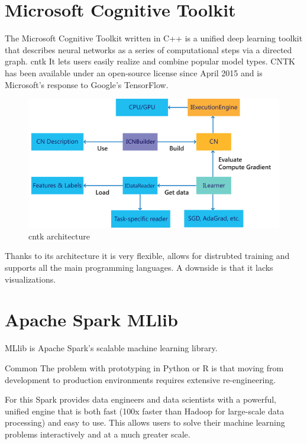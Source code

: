 \documentclass[thesis=M,english]{FITthesis}[2012/06/26]
\begin{document}
\section{Microsoft Cognitive Toolkit}

The Microsoft Cognitive Toolkit\cite{ml_cntk} written in C++ is a unified deep learning toolkit that describes neural networks as a series of computational steps via a directed graph. \acrshort{cntk} It lets users easily realize and combine popular model types. CNTK has been available under an open-source license since April 2015 and is Microsoft's response to Google's TensorFlow.


\begin{figure}[h!]\centering
	\includegraphics[width=1\textwidth]{pictures/ml_cntk_architecture}
	\caption{\acrshort{cntk} architecture \cite{ml_cntk}}\label{fig:ml_cntk_architecture}
\end{figure}

Thanks to its architecture it is very flexible, allows for distrubted training and supports all the main programming languages. A downside is that it lacks visualizations.

\section{Apache Spark MLlib}

MLlib\cite{ml_spark} is Apache Spark's scalable machine learning library.

Common\cite{ml_spark_advantages]} The problem with prototyping in Python or R is that moving from development to production environments requires extensive re-engineering. 

For this Spark provides data engineers and data scientists with a powerful, unified engine that is both fast (100x faster than Hadoop for large-scale data processing) and easy to use. This allows users to solve their machine learning problems interactively and at a much greater scale.\\
\end{document}
